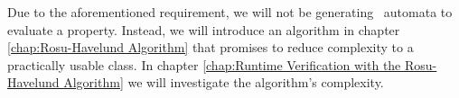 Due to the aforementioned requirement, we will not be generating \Buchi\ automata to evaluate a property.  Instead, we will introduce an algorithm in chapter \ref{chap:Rosu-Havelund Algorithm} that promises to reduce complexity to a practically usable class.  In chapter \ref{chap:Runtime Verification with the Rosu-Havelund Algorithm} we will investigate the algorithm's complexity.







